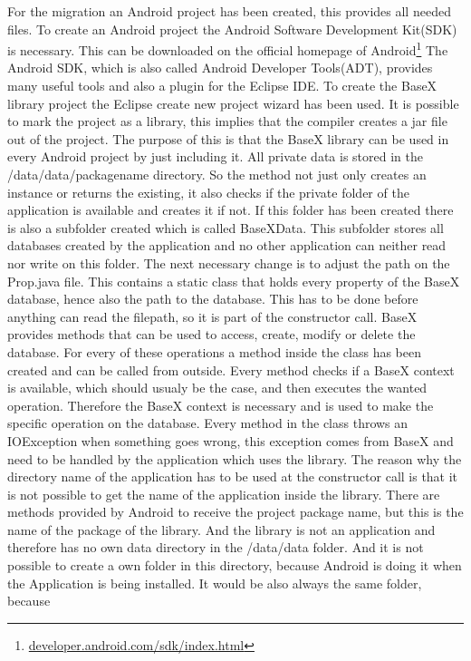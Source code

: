 \newpage





For the migration an Android project has been created, this provides all needed files.
To create an Android project the Android Software Development Kit(SDK) is necessary.
This can be downloaded on the official homepage of Android\footnote{\url{developer.android.com/sdk/index.html}}
The Android SDK, which is also called Android Developer Tools(ADT), provides many useful tools and also a plugin for the Eclipse IDE.
To create the BaseX library project the Eclipse create new project wizard has been used.
It is possible to mark the project as a library, this implies that the compiler creates a jar file out of the project.
The purpose of this is that the BaseX library can be used in every Android project by just including it.
All private data is stored in the /data/data/packagename directory.
So the method not just only creates an instance or returns the existing, it also checks if the private folder of the application is available and creates it if not.
If this folder has been created there is also a subfolder created which is called BaseXData.
This subfolder stores all databases created by the application and no other application can neither read nor write on this folder.
The next necessary change is to adjust the path on the Prop.java file.
This contains a static class that holds every property of the BaseX database, hence also the path to the database.
This has to be done before anything can read the filepath, so it is part of the constructor call.
BaseX provides methods that can be used to access, create, modify or delete the database.
For every of these operations a method inside the class has been created and can be called from outside.
Every method checks if a BaseX context is available, which should usualy be the case, and then executes the wanted operation.
Therefore the BaseX context is necessary and is used to make the specific operation on the database.
Every method in the class throws an IOException when something goes wrong, this exception comes from BaseX and need to be handled by the application which uses the library.
The reason why the directory name of the application has to be used at the constructor call is that it is not possible to get the name of the application inside the library.
There are methods provided by Android to receive the project package name, but this is the name of the package of the library.
And the library is not an application and therefore has no own data directory in the /data/data folder.
And it is not possible to create a own folder in this directory, because Android is doing it when the Application is being installed.
It would be also always the same folder, because 



